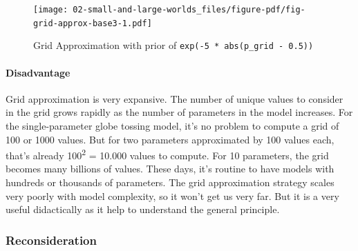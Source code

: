 \documentclass[
  letterpaper,
  DIV=11,
  numbers=noendperiod]{scrreprt}
\let\oldparagraph\paragraph
\renewcommand{\paragraph}[1]{\oldparagraph{#1}\mbox{}}
\begin{document}
\begin{figure}[H]

{\centering \texttt{[image: 02-small-and-large-worlds\_files/figure-pdf/fig-grid-approx-base3-1.pdf]}

}

\caption{\label{fig-grid-approx-base3}Grid Approximation with prior of
\texttt{exp(-5\ *\ abs(p\_grid\ -\ 0.5))}}

\end{figure}

\hypertarget{disadvantage}{%
\paragraph{Disadvantage}\label{disadvantage}}

Grid approximation is very expansive. The number of unique values to
consider in the grid grows rapidly as the number of parameters in the
model increases. For the single-parameter globe tossing model, it's no
problem to compute a grid of 100 or 1000 values. But for two parameters
approximated by 100 values each, that's already 100\textsuperscript{2} =
10.000 values to compute. For 10 parameters, the grid becomes many
billions of values. These days, it's routine to have models with
hundreds or thousands of parameters. The grid approximation strategy
scales very poorly with model complexity, so it won't get us very far.
But it is a very useful didactically as it help to understand the
general principle.

\hypertarget{reconsideration}{%
\subsubsection{Reconsideration}\label{reconsideration}}
\end{document}
